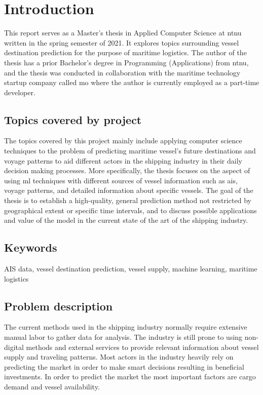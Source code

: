 \chapter{Introduction}


This report serves as a Master's thesis in Applied Computer Science at \acrfull{ntnu} written in the spring semester of 2021. It explores topics surrounding vessel destination prediction for the purpose of maritime logistics. The author of the thesis has a prior Bachelor’s degree in Programming (Applications) from \acrshort{ntnu}, and the thesis was conducted in collaboration with the maritime technology startup company called \acrfull{mo} where the author is currently employed  as a part-time developer.


\section{Topics covered by project}
\label{sec:topics_covered}

The topics covered by this project mainly include applying computer science techniques to the problem of predicting maritime vessel's future destinations and voyage patterns to aid different actors in the shipping industry in their daily decision making processes. More specifically, the thesis focuses on the aspect of using \acrfull{ml} techniques with different sources of vessel information such as \acrfull{ais}, voyage patterns, and detailed information about specific vessels. The goal of the thesis is to establish a high-quality, general prediction method not restricted by geographical extent or specific time intervals, and to discuss possible applications and value of the model in the current state of the art of the shipping industry.

\section{Keywords}

AIS data, vessel destination prediction, vessel supply, machine learning, maritime logistics

\section{Problem description}
\label{sec:problem_desc}

The current methods used in the shipping industry normally require extensive manual labor to gather data for analysis. The industry is still prone to using non-digital methods and external services to provide relevant information about vessel supply and traveling patterns. Most actors in the industry heavily rely on predicting the market in order to make smart decisions resulting in beneficial investments. In order to predict the market the most important factors are cargo demand and vessel availability. %

